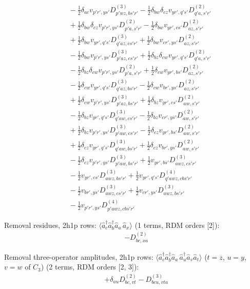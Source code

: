 \begin{align*}
&\quad -\tfrac12\delta_{ac}v_{p'r',ys'}D^{(3)}_{p'wz,bs'r'}-\tfrac12\delta_{bw}\delta_{cz}v_{yr',q's'}D^{(2)}_{q'a,s'r'} \\
&\quad +\tfrac12\delta_{bw}\delta_{cz}v_{p'r',ys'}D^{(2)}_{p'a,s'r'}-\tfrac12\delta_{bw}v_{yr',cs'}D^{(2)}_{az,s'r'} \\
&\quad +\tfrac12\delta_{bw}v_{yr',q's'}D^{(3)}_{q'az,cs'r'}+\tfrac12\delta_{bw}v_{cr',ys'}D^{(2)}_{az,s'r'} \\
&\quad -\tfrac12\delta_{bw}v_{p'r',ys'}D^{(3)}_{p'az,cs'r'}+\tfrac12\delta_{bz}\delta_{cw}v_{yr',q's'}D^{(2)}_{q'a,s'r'} \\
&\quad -\tfrac12\delta_{bz}\delta_{cw}v_{p'r',ys'}D^{(2)}_{p'a,s'r'}+\tfrac12\delta_{cw}v_{yr',bs'}D^{(2)}_{az,s'r'} \\
&\quad -\tfrac12\delta_{cw}v_{yr',q's'}D^{(3)}_{q'az,bs'r'}-\tfrac12\delta_{cw}v_{br',ys'}D^{(2)}_{az,s'r'} \\
&\quad +\tfrac12\delta_{cw}v_{p'r',ys'}D^{(3)}_{p'az,bs'r'}+\tfrac12\delta_{bz}v_{yr',cs'}D^{(2)}_{aw,s'r'} \\
&\quad -\tfrac12\delta_{bz}v_{yr',q's'}D^{(3)}_{q'aw,cs'r'}-\tfrac12\delta_{bz}v_{cr',ys'}D^{(2)}_{aw,s'r'} \\
&\quad +\tfrac12\delta_{bz}v_{p'r',ys'}D^{(3)}_{p'aw,cs'r'}-\tfrac12\delta_{cz}v_{yr',bs'}D^{(2)}_{aw,s'r'} \\
&\quad +\tfrac12\delta_{cz}v_{yr',q's'}D^{(3)}_{q'aw,bs'r'}+\tfrac12\delta_{cz}v_{br',ys'}D^{(2)}_{aw,s'r'} \\
&\quad -\tfrac12\delta_{cz}v_{p'r',ys'}D^{(3)}_{p'aw,bs'r'}+\tfrac12v_{yr',bs'}D^{(3)}_{awz,cs'r'} \\
&\quad -\tfrac12v_{yr',cs'}D^{(3)}_{awz,bs'r'}+\tfrac12v_{yr',q's'}D^{(4)}_{q'awz,cbs'r'} \\
&\quad -\tfrac12v_{br',ys'}D^{(3)}_{awz,cs'r'}+\tfrac12v_{cr',ys'}D^{(3)}_{awz,bs'r'} \\
&\quad -\tfrac12v_{p'r',ys'}D^{(4)}_{p'awz,cbs'r'}
\end{align*}

\noindent Removal residues, 2h1p rows: $\langle \hat a_c^\dagger \hat a_b^\dagger \hat a_a\,\hat a_x\rangle$ (1 terms, RDM orders [2]):
\begin{align*}
&-D^{(2)}_{bc,xa}
\end{align*}

\noindent Removal three-operator amplitudes, 2h1p rows: $\langle \hat a_c^\dagger \hat a_b^\dagger \hat a_a\,\hat a_u^\dagger \hat a_v\hat a_t\rangle$ ($t=z$, $u=y$, $v=w$ of $C_3$) (2 terms, RDM orders [2, 3]):
\begin{align*}
&+\delta_{au}D^{(2)}_{bc,vt}-D^{(3)}_{bcu,vta}
\end{align*}

